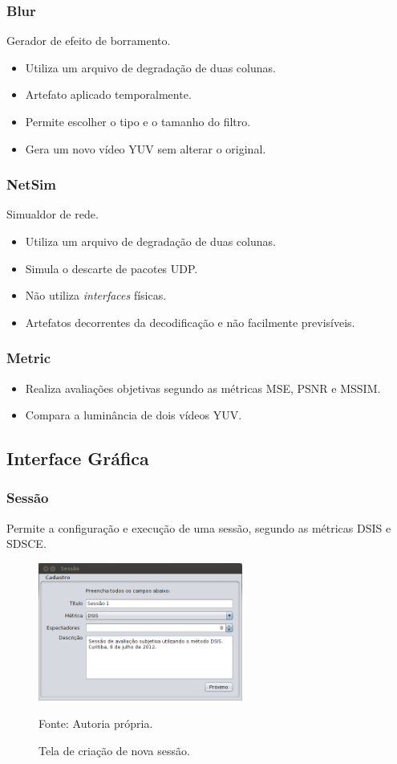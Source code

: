     \begin{frame}\frametitle{Blur}
        Gerador de efeito de borramento.
        \begin{itemize}
            \item Utiliza um arquivo de degradação de duas colunas.
            \item Artefato aplicado temporalmente.
            \item Permite escolher o tipo e o tamanho do filtro.
            \item Gera um novo vídeo YUV sem alterar o original.
        \end{itemize}
    \end{frame}
    
    \begin{frame}\frametitle{NetSim}
        Simualdor de rede.
        \begin{itemize}
            \item Utiliza um arquivo de degradação de duas colunas.
            \item Simula o descarte de pacotes UDP.
            \item Não utiliza \emph{interfaces} físicas.
            \item Artefatos decorrentes da decodificação e não facilmente previsíveis. %
        \end{itemize}
    \end{frame}
    
    \begin{frame}\frametitle{Metric}
        \begin{itemize}
            \item Realiza avaliações objetivas segundo as métricas MSE, PSNR e MSSIM.
            \item Compara a luminância de dois vídeos YUV.
        \end{itemize}
    \end{frame}

\subsection{Interface Gráfica}
        \begin{frame}\frametitle{Sessão}
            Permite a configuração e execução de uma sessão, segundo as métricas DSIS e SDSCE.
		    \begin{figure}
			    \includegraphics[width=0.6\textwidth]{./imgs/sessao1.png}
			    \caption{Tela de criação de nova sessão.}
			    \tiny
			    Fonte: Autoria própria.
		    \end{figure}
        \end{frame}
        
